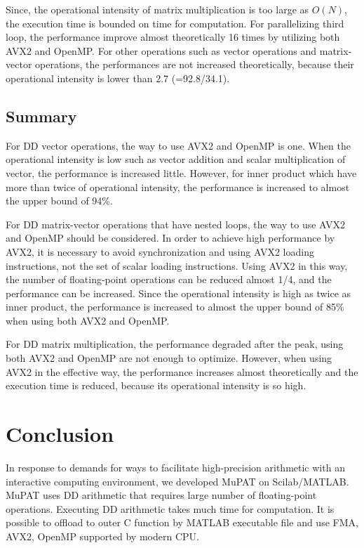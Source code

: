 \documentclass{IOS-Book-Article}
\begin{document}
Since, the operational intensity of matrix multiplication is too large as $O(N)$, the execution time is bounded on time for computation. For parallelizing third loop, the performance improve almost theoretically 16 times by utilizing both AVX2 and OpenMP.
For other operations such as vector operations and matrix-vector operations, the performances are not increased theoretically, because their operational intensity is lower than 2.7 (=92.8/34.1). %



\subsection{Summary}

For DD vector operations, the way to use AVX2 and OpenMP is one. When the operational intensity is low  such as vector addition and scalar multiplication of vector, the performance is increased little. However, for inner product which have more than twice of operational intensity, the performance is increased to almost the upper bound of 94\%. 

For DD matrix-vector operations that have nested loops, the way to use AVX2 and OpenMP should be considered. In order to achieve high performance by AVX2, it is necessary to avoid synchronization and using AVX2 loading instructions, not the set of scalar loading instructions. Using AVX2 in this way, the number of floating-point operations can be reduced almost 1/4, and the performance can be increased. Since the operational intensity is high as twice as inner product, the performance is increased to almost the upper bound of 85\% when using both AVX2 and OpenMP. 

For DD matrix multiplication, the performance degraded after the peak, using both AVX2 and OpenMP are not enough to optimize. However, when using AVX2 in the effective way, the performance increases almost theoretically and the execution time is reduced, because its operational intensity is so high.

\section{Conclusion}
In response to demands for ways to facilitate high-precision arithmetic with an interactive computing environment, we developed MuPAT on Scilab/MATLAB. MuPAT uses DD arithmetic that requires large number of floating-point operations. Executing DD arithmetic takes much time for computation. It is possible to offload to outer C function by MATLAB executable file and use FMA, AVX2, OpenMP supported by modern CPU. 
\end{document}
